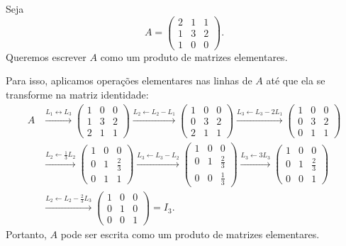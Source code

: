 \begin{example}
    Seja 
    \begin{equation*}
        A = \begin{pmatrix}
            2 & 1 & 1 \\
            1 & 3 & 2 \\
            1 & 0 & 0
        \end{pmatrix}.
    \end{equation*}
    Queremos escrever $A$ como um produto de matrizes elementares.
    
    Para isso, aplicamos operações elementares nas linhas de $A$ até que ela se transforme na matriz identidade:
    \begin{align*}
        A
        &\xrightarrow{L_1\leftrightarrow L_3}
        \begin{pmatrix}
            1 & 0 & 0 \\
            1 & 3 & 2 \\
            2 & 1 & 1
        \end{pmatrix}
        \xrightarrow{L_2\leftarrow L_2 - L_1}
        \begin{pmatrix}
            1 & 0 & 0 \\
            0 & 3 & 2 \\
            2 & 1 & 1
        \end{pmatrix}
        \xrightarrow{L_3\leftarrow L_3 - 2L_1}
        \begin{pmatrix}
            1 & 0 & 0 \\
            0 & 3 & 2 \\
            0 & 1 & 1
        \end{pmatrix} \\
        &\xrightarrow{L_2\leftarrow \frac{1}{3}L_2}
        \begin{pmatrix}
            1 & 0 & 0 \\
            0 & 1 & \frac{2}{3} \\
            0 & 1 & 1
        \end{pmatrix}
        \xrightarrow{L_3\leftarrow L_3 - L_2}
        \begin{pmatrix}
            1 & 0 & 0 \\
            0 & 1 & \frac{2}{3} \\
            0 & 0 & \frac{1}{3}
        \end{pmatrix}
        \xrightarrow{L_3\leftarrow 3L_3}
        \begin{pmatrix}
            1 & 0 & 0 \\
            0 & 1 & \frac{2}{3} \\
            0 & 0 & 1
        \end{pmatrix} \\
        &\xrightarrow{L_2\leftarrow L_2 - \frac{2}{3}L_3}
        \begin{pmatrix}
            1 & 0 & 0 \\
            0 & 1 & 0 \\
            0 & 0 & 1
        \end{pmatrix}
        = I_3.
    \end{align*}
    Portanto, $A$ pode ser escrita como um produto de matrizes elementares.
    

\end{example}
